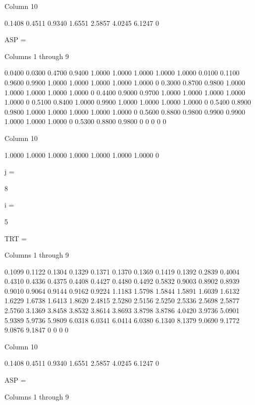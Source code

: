   Column 10

    0.1408
    0.4511
    0.9340
    1.6551
    2.5857
    4.0245
    6.1247
         0


ASP =

  Columns 1 through 9

    0.0400    0.0300    0.4700    0.9400    1.0000    1.0000    1.0000    1.0000    1.0000
    0.0100    0.1100    0.9600    0.9900    1.0000    1.0000    1.0000    1.0000    1.0000
         0    0.3000    0.8700    0.9800    1.0000    1.0000    1.0000    1.0000    1.0000
         0    0.4400    0.9000    0.9700    1.0000    1.0000    1.0000    1.0000    1.0000
         0    0.5100    0.8400    1.0000    0.9900    1.0000    1.0000    1.0000    1.0000
         0    0.5400    0.8900    0.9800    1.0000    1.0000    1.0000    1.0000    1.0000
         0    0.5600    0.8800    0.9800    0.9900    0.9900    1.0000    1.0000    1.0000
         0    0.5300    0.8800    0.9800         0         0         0         0         0

  Column 10

    1.0000
    1.0000
    1.0000
    1.0000
    1.0000
    1.0000
    1.0000
         0


j =

     8


i =

     5


TRT =

  Columns 1 through 9

    0.1099    0.1122    0.1304    0.1329    0.1371    0.1370    0.1369    0.1419    0.1392
    0.2839    0.4004    0.4310    0.4336    0.4375    0.4408    0.4427    0.4480    0.4492
    0.5832    0.9003    0.8902    0.8939    0.9010    0.9064    0.9144    0.9162    0.9224
    1.1183    1.5798    1.5844    1.5891    1.6039    1.6132    1.6229    1.6738    1.6413
    1.8620    2.4815    2.5280    2.5156    2.5250    2.5336    2.5698    2.5877    2.5760
    3.1369    3.8458    3.8532    3.8614    3.8693    3.8798    3.8786    4.0420    3.9736
    5.0901    5.9389    5.9736    5.9809    6.0318    6.0341    6.0414    6.0380    6.1340
    8.1379    9.0690    9.1772    9.0876    9.1847         0         0         0         0

  Column 10

    0.1408
    0.4511
    0.9340
    1.6551
    2.5857
    4.0245
    6.1247
         0


ASP =

  Columns 1 through 9

